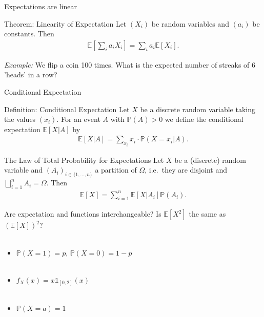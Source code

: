 \documentclass[11pt,pdf,ngerman,UKenglish]{beamer}%
\newcommand{\IP}{\mathbb{P}}
\newcommand{\IE}{{\mathbb{E}}}
\newcommand{\1}{\mathbb{1}}
\theoremstyle{thm}
\theoremstyle{def}
\begin{document}
\begin{frame}{Expectations are linear}
\begin{block}{Theorem: Linearity of Expectation}
Let $(X_i)$ be random variables and $(a_i)$ be constants. Then
\begin{align*}
\IE\left[ \sum_i a_i X_i \right] = \sum_i a_i \IE[ X_i]
.
\end{align*}
\end{block}
\vfill
\textit{Example:} We flip a coin 100 times. What is the expected number of streaks of 6 'heads'
in a row?
\end{frame}


\begin{frame}{Conditional Expectation}
\begin{block}{Definition: Conditional Expectation}
Let $X$ be a discrete random variable taking the values $(x_i)$. For an event $A$ with $\IP(A) >0$ we define the conditional expectation $\IE[ X \vert A ]$ by
\begin{align*}
\IE[ X \vert A] = \sum_{x_i} x_i \cdot \IP(X= x_i \vert A).
\end{align*}
\end{block}
\pause
\begin{block}{The Law of Total Probability for Expectations}
Let $X$ be a (discrete) random variable and $(A_i)_{i \in \{1, \ldots, n\}}$ a partition of $\Omega$, i.e.\ they are disjoint and $\bigsqcup_{i=1}^n A_i = \Omega$. Then
\begin{align*}
\IE[ X ] = \sum_{i=1}^n \IE[ X \vert A_i] \IP(A_i).
\end{align*}
\end{block}
\end{frame}


\begin{frame}{Are expectation and functions interchangeable?}
Is $\IE[ X^2 ]$ the same as $( \IE[X])^2$?
\\ \
\begin{itemize}
\item $\IP(X=1)=p$, $\IP(X=0)=1-p$
\\ \
\item $f_X(x)= x \1_{[0,2]}(x)$
\\ \
\item $\IP(X=a) = 1$
\end{itemize}
\end{frame}


%
\end{document}
